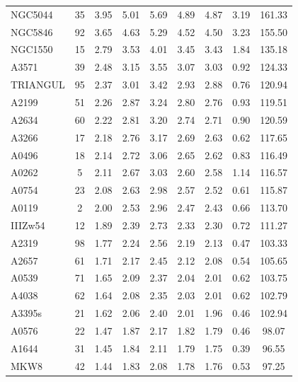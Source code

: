 \documentclass[10pt,aps,pra,reprint,amsmath,amsfonts,amssymb,showpacs,nofootinbib,floatfix]{revtex4-1}
\newcommand{\vstt}{\vspace{-0.0mm}}
\begin{document}
{\begin{table}
\begin{minipage}{2.0\columnwidth}
\begin{tabular}{l c c c c c c c c}
NGC5044  &  35 &   3.95 &   5.01 &   5.69 &   4.89 &   4.87 &   3.19 & 161.33 \vstt \\
NGC5846  &  92 &   3.65 &   4.63 &   5.29 &   4.52 &   4.50 &   3.23 & 155.50 \vstt \\
NGC1550  &  15 &   2.79 &   3.53 &   4.01 &   3.45 &   3.43 &   1.84 & 135.18 \vstt \\
A3571    &  39 &   2.48 &   3.15 &   3.55 &   3.07 &   3.03 &   0.92 & 124.33 \vstt \\
TRIANGUL &  95 &   2.37 &   3.01 &   3.42 &   2.93 &   2.88 &   0.76 & 120.94 \vstt \\
A2199    &  51 &   2.26 &   2.87 &   3.24 &   2.80 &   2.76 &   0.93 & 119.51 \vstt \\
A2634    &  60 &   2.22 &   2.81 &   3.20 &   2.74 &   2.71 &   0.90 & 120.59 \vstt \\
A3266    &  17 &   2.18 &   2.76 &   3.17 &   2.69 &   2.63 &   0.62 & 117.65 \vstt \\
A0496    &  18 &   2.14 &   2.72 &   3.06 &   2.65 &   2.62 &   0.83 & 116.49 \vstt \\
A0262    &   5 &   2.11 &   2.67 &   3.03 &   2.60 &   2.58 &   1.14 & 116.57 \vstt \\
A0754    &  23 &   2.08 &   2.63 &   2.98 &   2.57 &   2.52 &   0.61 & 115.87 \vstt \\
A0119    &   2 &   2.00 &   2.53 &   2.96 &   2.47 &   2.43 &   0.66 & 113.70 \vstt \\
IIIZw54  &  12 &   1.89 &   2.39 &   2.73 &   2.33 &   2.30 &   0.72 & 111.27 \vstt \\
A2319    &  98 &   1.77 &   2.24 &   2.56 &   2.19 &   2.13 &   0.47 & 103.33 \vstt \\
A2657    &  61 &   1.71 &   2.17 &   2.45 &   2.12 &   2.08 &   0.54 & 105.65 \vstt \\
A0539    &  71 &   1.65 &   2.09 &   2.37 &   2.04 &   2.01 &   0.62 & 103.75 \vstt \\
A4038    &  62 &   1.64 &   2.08 &   2.35 &   2.03 &   2.01 &   0.62 & 102.79 \vstt \\
A3395s   &  21 &   1.62 &   2.06 &   2.40 &   2.01 &   1.96 &   0.46 & 102.94 \vstt \\
A0576    &  22 &   1.47 &   1.87 &   2.17 &   1.82 &   1.79 &   0.46 &  98.07 \vstt \\
A1644    &  31 &   1.45 &   1.84 &   2.11 &   1.79 &   1.75 &   0.39 &  96.55 \vstt \\
MKW8     &  42 &   1.44 &   1.83 &   2.08 &   1.78 &   1.76 &   0.53 &  97.25 \vstt \\

\end{tabular}
\end{minipage}
\end{table}}
\end{document}
